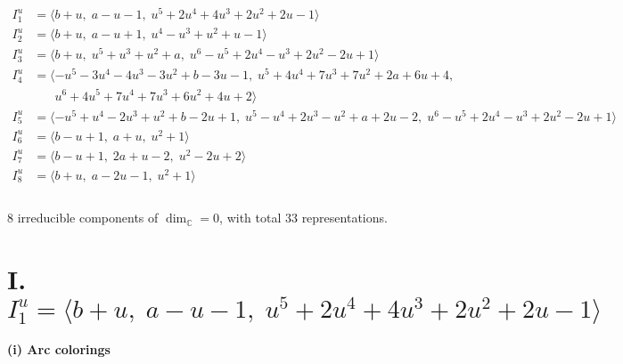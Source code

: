 \documentclass[1p]{elsarticle_modified}
\theoremstyle{definition}
\begin{document}
\begin{align*}
I^u_{1}&=\langle 
b+u,\;a- u-1,\;u^5+2 u^4+4 u^3+2 u^2+2 u-1\rangle \\
I^u_{2}&=\langle 
b+u,\;a- u+1,\;u^4- u^3+u^2+u-1\rangle \\
I^u_{3}&=\langle 
b+u,\;u^5+u^3+u^2+a,\;u^6- u^5+2 u^4- u^3+2 u^2-2 u+1\rangle \\
I^u_{4}&=\langle 
- u^5-3 u^4-4 u^3-3 u^2+b-3 u-1,\;u^5+4 u^4+7 u^3+7 u^2+2 a+6 u+4,\\
\phantom{I^u_{4}}&\phantom{= \langle  }u^6+4 u^5+7 u^4+7 u^3+6 u^2+4 u+2\rangle \\
I^u_{5}&=\langle 
- u^5+u^4-2 u^3+u^2+b-2 u+1,\;u^5- u^4+2 u^3- u^2+a+2 u-2,\;u^6- u^5+2 u^4- u^3+2 u^2-2 u+1\rangle \\
I^u_{6}&=\langle 
b- u+1,\;a+u,\;u^2+1\rangle \\
I^u_{7}&=\langle 
b- u+1,\;2 a+u-2,\;u^2-2 u+2\rangle \\
I^u_{8}&=\langle 
b+u,\;a-2 u-1,\;u^2+1\rangle \\
\\
\end{align*}
\raggedright * 8 irreducible components of $\dim_{\mathbb{C}}=0$, with total 33 representations.\\
\newpage
\renewcommand{\arraystretch}{1}
\centering \section*{I. $I^u_{1}= \langle b+u,\;a- u-1,\;u^5+2 u^4+4 u^3+2 u^2+2 u-1 \rangle$}
\flushleft \textbf{(i) Arc colorings}\\
\end{document}
